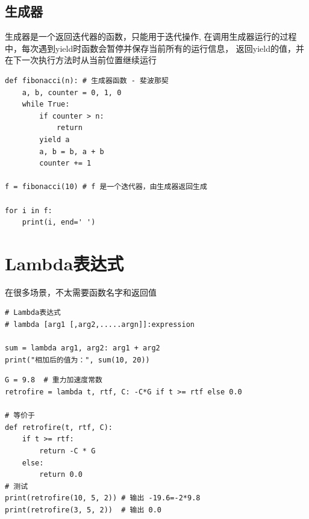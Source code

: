 \subsection{生成器}
生成器是一个返回迭代器的函数，只能用于迭代操作,
在调用生成器运行的过程中，每次遇到yield时函数会暂停并保存当前所有的运行信息，
返回yield的值，并在下一次执行方法时从当前位置继续运行

\begin{lstlisting}[style=demostyle,numbers=none]
def fibonacci(n): # 生成器函数 - 斐波那契
    a, b, counter = 0, 1, 0
    while True:
        if counter > n:
            return
        yield a
        a, b = b, a + b
        counter += 1

f = fibonacci(10) # f 是一个迭代器，由生成器返回生成

for i in f:
    print(i, end=' ')
\end{lstlisting}


\section{Lambda表达式}
在很多场景，不太需要函数名字和返回值

\begin{lstlisting}[style=demostyle,numbers=none]
# Lambda表达式
# lambda [arg1 [,arg2,.....argn]]:expression

sum = lambda arg1, arg2: arg1 + arg2
print("相加后的值为：", sum(10, 20))
\end{lstlisting}


\begin{lstlisting}[style=demostyle,numbers=none]
G = 9.8  # 重力加速度常数
retrofire = lambda t, rtf, C: -C*G if t >= rtf else 0.0

# 等价于
def retrofire(t, rtf, C):
    if t >= rtf:
        return -C * G
    else:
        return 0.0
# 测试
print(retrofire(10, 5, 2)) # 输出 -19.6=-2*9.8
print(retrofire(3, 5, 2))  # 输出 0.0
\end{lstlisting}

